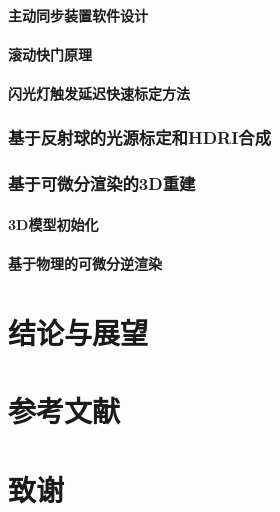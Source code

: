 \documentclass{ctexart}
\begin{document}
\paragraph{主动同步装置软件设计}

\paragraph{滚动快门原理}

\paragraph{闪光灯触发延迟快速标定方法}

\subsubsection{基于反射球的光源标定和HDRI合成}

\subsubsection{基于可微分渲染的3D重建}

\paragraph{3D模型初始化}

\paragraph{基于物理的可微分逆渲染}

\section{结论与展望}

\section*{参考文献}

\section*{致谢}
\end{document}
